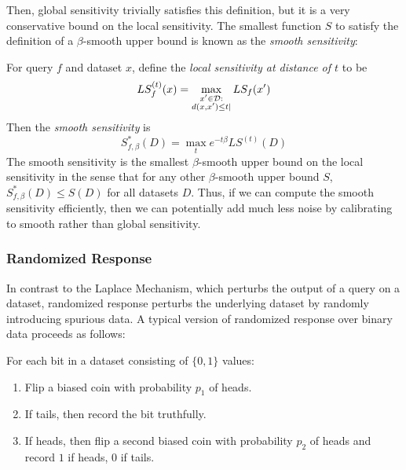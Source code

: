  Then, global sensitivity trivially satisfies this definition, but it is a very conservative bound on the local sensitivity. The smallest function $S$ to satisfy the definition of a $\beta$-smooth upper bound is known as the \emph{smooth sensitivity}:
\begin{definition}
\label{def:smooth}
For query $f$ and dataset $x$, define the \emph{local sensitivity at distance of $t$} to be
$$LS_f^{(t)}(x) = \max_{\substack{x' \in \mathcal{D}:\\ d(x, x') \leq t|}} LS_f(x')$$
Then the \emph{smooth sensitivity} is
$$S^*_{f, \beta}(D) = \max_{t} e^{-t \beta}  LS^{(t)}(D)$$
The smooth sensitivity is the smallest $\beta$-smooth upper bound on the local sensitivity in the sense that for any other $\beta$-smooth upper bound $S$, $S^*_{f, \beta}(D) \leq S(D)$ for all datasets $D$. Thus, if we can compute the smooth sensitivity efficiently, then we can potentially add much less noise by calibrating to smooth rather than global sensitivity.
\end{definition}


\subsubsection{Randomized Response}

In contrast to the Laplace Mechanism, which perturbs the output of a query on a dataset, randomized response perturbs the underlying dataset by randomly introducing spurious data. A typical version of randomized response over binary data proceeds as follows:


For each bit in a dataset consisting of $\{ 0,1 \}$ values:
\vspace{-0.2in}
\begin{enumerate}
	\item Flip a biased coin with probability $p_1$ of heads.
	\item If tails, then record the bit truthfully.
	\item If heads, then flip a second biased coin with probability $p_2$ of heads and record $1$ if heads, $0$ if tails.
\end{enumerate}

